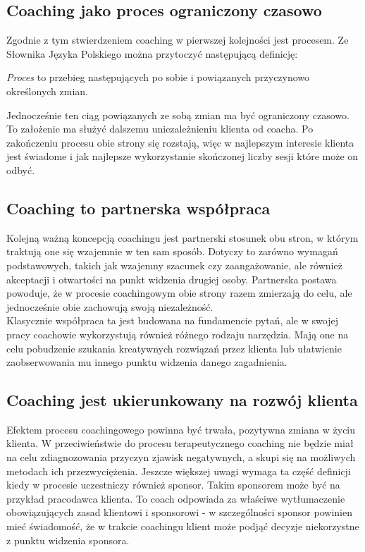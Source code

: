 \subsection{Coaching jako proces ograniczony czasowo}
Zgodnie z tym stwierdzeniem coaching w pierwszej kolejności jest procesem. Ze Słownika Języka Polskiego można przytoczyć następującą definicję:
\begin{defn}
\emph{Proces} to przebieg następujących po sobie i powiązanych przyczynowo określonych zmian.
\end{defn}
Jednocześnie ten ciąg powiązanych ze sobą zmian ma być ograniczony czasowo. To założenie ma służyć dalszemu uniezależnieniu klienta
od coacha. Po zakończeniu procesu obie strony się rozstają, więc w najlepszym interesie klienta jest świadome i jak najlepsze wykorzystanie
skończonej liczby sesji które może on odbyć.

\subsection{Coaching to partnerska współpraca}
Kolejną ważną koncepcją coachingu jest partnerski stosunek obu stron, w którym traktują one się wzajemnie w ten sam sposób. Dotyczy to zarówno
wymagań podstawowych, takich jak wzajemny szacunek czy zaangażowanie, ale również akceptacji i otwartości na punkt widzenia drugiej
osoby. Partnerska postawa powoduje, że w procesie coachingowym obie strony razem zmierzają do celu, ale jednocześnie obie zachowują
swoją niezależność. \\

Klasycznie współpraca ta jest budowana na fundamencie pytań, ale w swojej pracy coachowie wykorzystują również różnego rodzaju
narzędzia. Mają one na celu pobudzenie szukania kreatywnych rozwiązań przez klienta lub ułatwienie zaobserwowania
mu innego punktu widzenia danego zagadnienia.

\subsection{Coaching jest ukierunkowany na rozwój klienta}
Efektem procesu coachingowego powinna być trwała, pozytywna zmiana w życiu klienta. W przeciwieństwie do procesu terapeutycznego coaching
nie będzie miał na celu zdiagnozowania przyczyn zjawisk negatywnych, a skupi się na możliwych metodach ich przezwyciężenia. Jeszcze większej
uwagi wymaga ta część definicji kiedy w procesie uczestniczy również sponsor. Takim sponsorem może być na przykład pracodawca klienta.
To coach odpowiada za właściwe wytłumaczenie obowiązujących zasad klientowi i sponsorowi - w szczególności sponsor powinien mieć świadomość,
że w trakcie coachingu klient może podjąć decyzje niekorzystne z punktu widzenia sponsora.

